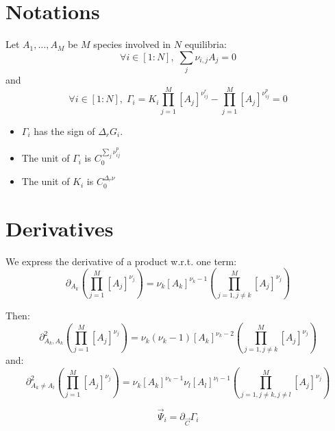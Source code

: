 \documentclass[aps,12pt]{revtex4}
\begin{document}
\section{Notations}

Let $A_1,\ldots,A_M$ be $M$ species involved in $N$ equilibria:
\begin{equation}
	\forall i\in[1:N], \; \sum_j \nu_{i,j} A_j = 0
\end{equation}
and
\begin{equation}
	\forall i\in[1:N], \; 
	\Gamma_i = K_i \prod_{j=1}^{M} [A_j]^{\nu^r_{ij}} 
	- \prod_{j=1}^{M} [A_j]^{\nu^p_{ij}} = 0
\end{equation}

\begin{itemize}
\item $\Gamma_i$ has the sign of $\Delta_r G_i$.
\item The unit of $\Gamma_i$ is $C_0^{\sum_j \nu^p_{ij} }$
\item The unit of $K_i$ is $C_0^{\Delta_r \nu}$
\end{itemize}


\section{Derivatives}
We express the derivative of a product w.r.t. one term:
\begin{equation}
	\partial_{A_k} \left( \prod_{j=1}^{M} [A_j]^{\nu_{j}} \right)  =
	\nu_k [A_k]^{\nu_k-1} \left( \prod_{j=1,j\not=k}^{M} [A_j]^{\nu_{j}} \right)
\end{equation}

Then:
\begin{equation}
	\partial^2_{A_k, A_k} \left( \prod_{j=1}^{M} [A_j]^{\nu_{j}} \right)  =
	\nu_k (\nu_k-1) [A_k]^{\nu_k-2} \left( \prod_{j=1,j\not=k}^{M} [A_j]^{\nu_{j}} \right)
\end{equation}
and:
\begin{equation}
	\partial^2_{A_k\not=A_l} \left( \prod_{j=1}^{M} [A_j]^{\nu_{j}} \right)  =
	\nu_k [A_k]^{\nu_k-1} \nu_l [A_l]^{\nu_l-1}\left( \prod_{j=1,j\not=k,j\not=l}^{M} [A_j]^{\nu_{j}} \right)
\end{equation}

\begin{equation}
	\vec{\Psi}_i = \partial_{\vec{C}} \Gamma_i
\end{equation}

%
\end{document}
